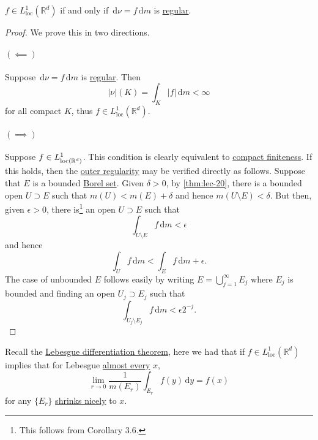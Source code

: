 \begin{lemma}
	\(f \in L^1_{\mathrm{loc}}(\mathbb{R}^d)\) if and only if \(\,\mathrm{d}\nu = f \,\mathrm{d}m\) is \hyperref[def:regular]{regular}.
\end{lemma}
\begin{proof}
	We prove this in two directions.
	\paragraph{\((\impliedby)\)}
	Suppose \(\,\mathrm{d} \nu = f \,\mathrm{d} m\) is \hyperref[def:regular]{regular}. Then
	\[
		\left\vert \nu \right\vert(K) = \int_K \left\vert f \right\vert \,\mathrm{d}m < \infty
	\]
	for all compact \(K\), thus \(f \in L^1_{\mathrm{loc}}(\mathbb{R}^d)\).

	\paragraph{\((\implies)\)}
	Suppose \(f\in L^1_{\mathrm{loc}(\mathbb{\MakeUppercase{r}} ^d) }\). This condition is clearly equivalent to
	\hyperref[def:regular-compact-finite]{compact finiteness}. If this holds, then the \hyperref[def:regular-outer-regularity]{outer regularity}
	may be verified directly as follows. Suppose that \(E\) is a bounded \hyperref[def:Borel-set]{Borel set}. Given \(\delta > 0\), by \autoref{thm:lec-20},
	there is a bounded open \(U \supset E\) such that \(m(U) < m(E)+ \delta \) and hence \(m(U\setminus E)< \delta \). But then, given \(\epsilon >0\), there
	is\footnote{This follows from \cite{folland1999real} Corollary 3.6.} an open \(U \supset E\) such that
	\[
		\int _{U\setminus E}f\,\mathrm{d} m < \epsilon
	\]
	and hence
	\[
		\int _U f\,\mathrm{d} m < \int _E f\,\mathrm{d} m + \epsilon.
	\]
	The case of unbounded \(E\) follows easily by writing \(E = \bigcup_{j=1}^{\infty} E_{j}\)
	where \(E_{j} \) is bounded and finding an open \(U_{j} \supset E_{j} \) such that
	\[
		\int _{U_{j} \setminus E_{j} }f \,\mathrm{d} m < \epsilon 2^{-j}.
	\]
\end{proof}

\begin{prev}
	Recall the \hyperref[thm:Lebesgue-differentiation-theorem]{Lebesgue differentiation theorem}, here we had that if \(f \in L^1_{\mathrm{loc}}(\mathbb{R}^d)\)
	implies that for Lebesgue \hyperref[def:mu-almost-everywhere]{almost every} \(x\),
	\[
		\lim_{r \to 0} \frac{1}{m(E_r)} \int_{E_r} f(y) \,\mathrm{d}y = f(x)
	\]
	for any \(\{E_r\}\) \hyperref[def:shrink-nicely]{shrinks nicely} to \(x\).
\end{prev}

